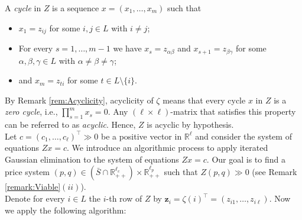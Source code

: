 \documentclass[11pt,fleqn]{article}
\begin{document}
A \emph{cycle} in $Z$ is a sequence $x =(x_1, \ldots , x_m)$ such that
\begin{itemize}
	\item $x_1 = z_{ij}$ for some $i,j \in L$ with $i \neq j$;
	\item For every $s = 1, \ldots ,m-1$ we have $x_s = z_{\alpha \beta}$ and $x_{s+1} = z_{\beta \gamma}$ for some $\alpha , \beta ,\gamma \in L$ with $\alpha \neq \beta \neq \gamma$;
	\item and $x_m = z_{ti}$ for some $t \in L \setminus \{ i \}$.
\end{itemize}
By Remark \ref{rem:Acyclicity}, acyclicity of $\zeta$ means that every cycle $x$ in $Z$ is a \emph{zero cycle}, i.e., $\prod^m_{s=1} x_s =0$. Any $(\ell \times \ell )$-matrix that satisfies this property can be referred to as \emph{acyclic}. Hence, $Z$ is acyclic by hypothesis. \\[1ex]
Let $c = (c_1, \ldots ,c_\ell)^\top \gg 0$ be a positive vector in $\mathbb R^\ell$ and consider the system of equations $Zx =c$. We introduce an algorithmic process to apply iterated Gaussian elimination to the system of equations $Zx=c$. Our goal is to find a price system $(p,q)\in (\bar{S}\cap \mathbb{R}^{\ell_c}_{++})\times \mathbb{R}^{\ell_p}_{++}$ such that $Z(p,q)\gg0$ (see Remark \ref{remark:Viable}$(ii)$). \\
Denote for every $i \in L$ the $i$-th row of $Z$ by $\mathbf{z}_i = \zeta(i)^\top = (z_{i1} , \ldots , z_{i\ell})$. Now we apply the following algorithm:
\end{document}
